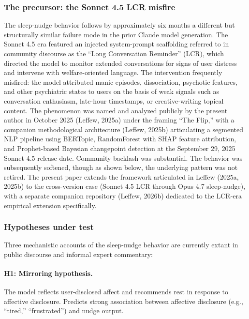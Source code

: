 \documentclass[11pt]{article}
\begin{document}
\subsubsection{The precursor: the Sonnet 4.5 LCR misfire}

The sleep-nudge behavior follows by approximately six months a different but structurally similar failure mode in the prior Claude model generation. The Sonnet 4.5 era featured an injected system-prompt scaffolding referred to in community discourse as the ``Long Conversation Reminder'' (LCR), which directed the model to monitor extended conversations for signs of user distress and intervene with welfare-oriented language. The intervention frequently misfired: the model attributed manic episodes, dissociation, psychotic features, and other psychiatric states to users on the basis of weak signals such as conversation enthusiasm, late-hour timestamps, or creative-writing topical content. The phenomenon was named and analyzed publicly by the present author in October 2025 (Leffew, 2025a) under the framing ``The Flip,'' with a companion methodological architecture (Leffew, 2025b) articulating a segmented NLP pipeline using BERTopic, RandomForest with SHAP feature attribution, and Prophet-based Bayesian changepoint detection at the September 29, 2025 Sonnet 4.5 release date. Community backlash was substantial. The behavior was subsequently softened, though as shown below, the underlying pattern was not retired. The present paper extends the framework articulated in Leffew (2025a, 2025b) to the cross-version case (Sonnet 4.5 LCR through Opus 4.7 sleep-nudge), with a separate companion repository (Leffew, 2026b) dedicated to the LCR-era empirical extension specifically.

\subsubsection{Hypotheses under test}

Three mechanistic accounts of the sleep-nudge behavior are currently extant in public discourse and informal expert commentary:

\paragraph{H1: Mirroring hypothesis.} The model reflects user-disclosed affect and recommends rest in response to affective disclosure. Predicts strong association between affective disclosure (e.g., ``tired,'' ``frustrated'') and nudge output.
\end{document}
